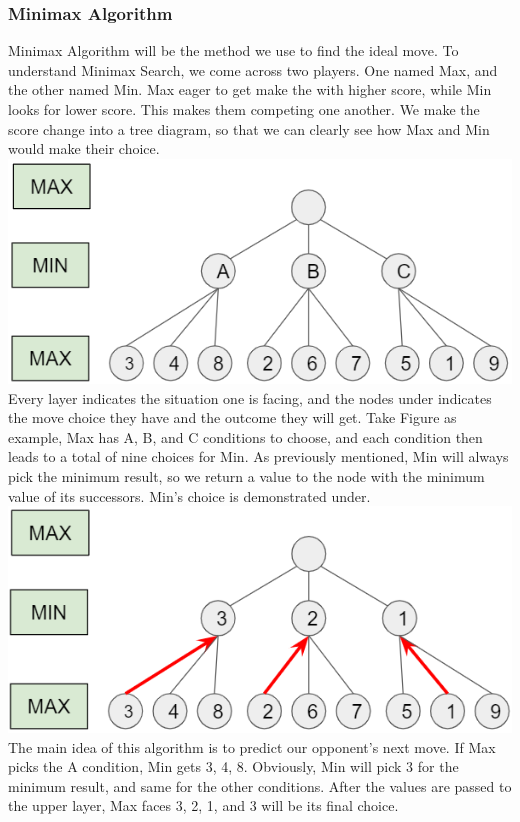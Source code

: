 \documentclass[aps,pra,reprint,amsmath,amssymb,floatfix]{revtex4-2}
\begin{document}
\subsubsection{Minimax Algorithm}
Minimax Algorithm will be the method we use to find the ideal move. To understand Minimax Search, we come across two players. One named Max, and the other named Min. Max eager to get make the with higher score, while Min looks for lower score. This makes them competing one another. We make the score change into a tree diagram, so that we can clearly see how Max and Min would make their choice.\\
\includegraphics[scale=0.6]{1.png}\\
Every layer indicates the situation one is facing, and the nodes under indicates the move choice they have and the outcome they will get. Take Figure as example, Max has A, B, and C conditions to choose, and each condition then leads to a total of nine choices for Min. As previously mentioned, Min will always pick the minimum result, so we return a value to the node with the minimum value of its successors. Min’s choice is demonstrated under.\\
\includegraphics[scale=0.6]{2.png}\\
The main idea of this algorithm is to predict our opponent’s next move. If Max picks the A condition, Min gets 3, 4, 8. Obviously, Min will pick 3 for the minimum result, and same for the other conditions. After the values are passed to the upper layer, Max faces 3, 2, 1, and 3 will be its final choice.\\
\end{document}
